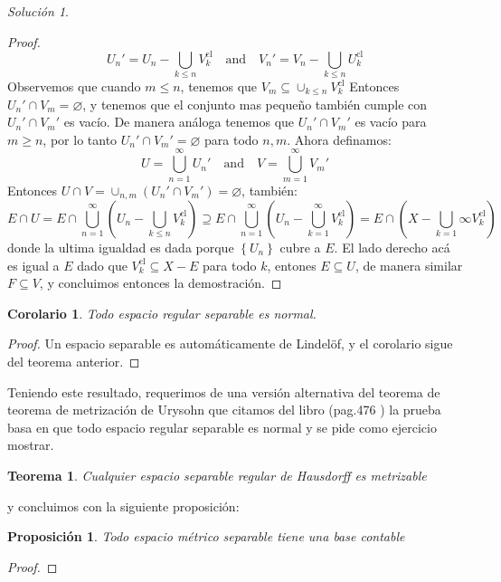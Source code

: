 \documentclass[notitlepage]{report}
\newtheorem{thm}{Teorema}
\newtheorem{prop}{Proposición}
\newtheorem{cor}{Corolario}
\theoremstyle{definition}
\theoremstyle{remark}
\newtheorem*{sol}{Solución}
\newcommand{\lrp}[1]{\left( #1 \right)}
\newcommand{\set}[1]{\left\lbrace #1 \right\rbrace}
\newcommand{\closure}[1]{ #1^{\textrm{cl}}}
\begin{document}
\begin{sol}
\begin{proof}
		\[ U_n' = U_n - \bigcup_{k \leq n} \closure{V_k} \quad \text{and} \quad V_n' = V_n - \bigcup_{k \leq n} \closure{U_k} \]
		Observemos que cuando $ m \leq n $, tenemos que $ V_m \subseteq \cup_{ k \leq n} \closure{V_k} $ Entonces $ U_n' \cap V_m = \varnothing $, y tenemos que el conjunto mas pequeño también cumple con $ U_n' \cap V_m' $ es vacío. De manera análoga tenemos que $ U_n' \cap V_m' $  es vacío para $ m \geq n $, por lo tanto $ U_n' \cap V_m' = \varnothing $ para todo $ n,m $. Ahora definamos:
		\[ U = \bigcup_{n = 1}^\infty U_n' \quad \textrm{and} \quad V = \bigcup_{m = 1}^\infty V_m' \]
		Entonces $ U \cap V = \cup_{n,m} \lrp{U_n' \cap V_m'} = \varnothing $, también:
		\[ E \cap U = E \cap \bigcup_{n = 1}^{\infty}\lrp{U_n - \bigcup_{k \leq n} \closure{V_k}} \supseteq E \cap \bigcup_{n = 1}^\infty \lrp{U_n - \bigcup_{k = 1}^{\infty }\closure{V_k}} = E \cap \lrp{X - \bigcup_{k = 1}\infty \closure{V_k}} \] 
		donde la ultima igualdad es dada porque $ \set{U_n} $ cubre a $ E $. El lado derecho acá es igual a $ E $ dado que $ \closure{V_k}  \subseteq X - E $ para todo $ k $, entones $ E \subseteq U $, de manera similar $ F \subseteq V $, y concluimos entonces la demostración.
	\end{proof}
	\begin{cor}
		Todo espacio regular separable es normal.
	\end{cor}
	\begin{proof}
		Un espacio separable es automáticamente de Lindelöf, y el corolario sigue del teorema anterior.
	\end{proof}
	Teniendo este resultado, requerimos de una versión alternativa del teorema de teorema de metrización de Urysohn que citamos del libro \cite{basicranal} (pag.476 ) la prueba basa en que todo espacio regular separable es normal y se pide como ejercicio mostrar.
	\begin{thm}
		Cualquier espacio separable regular de Hausdorff es metrizable
	\end{thm}	
	y concluimos con la siguiente proposición:
	\begin{prop}
		Todo espacio métrico separable tiene una base contable
	\end{prop}
	\begin{proof}

\end{proof}
\end{sol}
\end{document}
